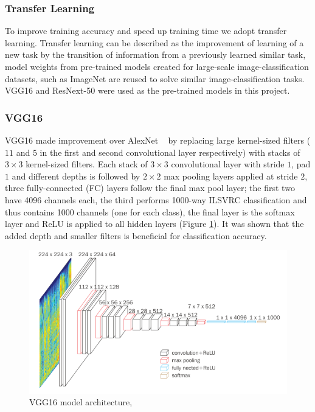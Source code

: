 \documentclass{beamer}
\begin{document}
\begin{frame}[allowframebreaks]
\frametitle{Transfer Learning}
To improve training accuracy and speed up training time we adopt transfer learning. Transfer learning can be described as the improvement of learning of a new task by the transition of information from a previously learned similar task, model weights from pre-trained models created for large-scale image-classification datasets, such as ImageNet are reused to solve similar image-classification tasks. VGG16 and ResNext-50 were used as the pre-trained models in this project.
\end{frame}

\begin{frame}[allowframebreaks]
\frametitle{VGG16}
VGG16  made  improvement over AlexNet {~\cite{Krizhevsky}} by replacing large kernel-sized filters ($11$ and $5$ in the first and second convolutional layer respectively) with stacks of $3 \times 3$ kernel-sized filters. Each stack of  $3 \times 3$ convolutional layer with stride $1$, pad $1$ and different depths is followed by $2 \times 2$ max pooling layers applied at stride $2$, three fully-connected (FC) layers follow the final max pool layer; the first two have 4096 channels each, the third performs 1000-way ILSVRC classification and thus contains 1000 channels (one for each class), the final layer is the softmax layer and ReLU is applied to all hidden layers (Figure \ref{fig:vgg16_arch}). It was shown that the added depth and smaller filters is beneficial for classification accuracy.

\begin{figure}[H]
\centering
\includegraphics[scale=0.5]{png/vgg16.png}
\caption[VGG16 model architecture]{VGG16 model architecture, }	
\label{fig:vgg16_arch}
\end{figure} 
\end{frame}
\end{document}
